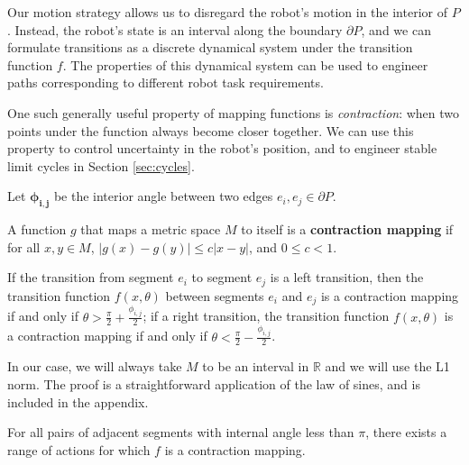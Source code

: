 \documentclass[]{styles/svproc}  %
\begin{document}

Our motion strategy allows us to disregard the robot's motion in the interior of
$P$. Instead, the robot's state is an interval 
along the boundary $\partial P$, and we can formulate transitions as a discrete
dynamical system under the transition function $f$. The properties of this
dynamical system can be used to engineer paths corresponding to different robot
task requirements.

One such generally useful property of mapping functions is \emph{contraction}: 
when two points under the function always become closer together. We can use this property to control
uncertainty in the robot's position, and to engineer stable limit cycles in
Section \ref{sec:cycles}.

\begin{definition}
Let $\bm{\phi_{i,j}}$ be the interior angle between two edges $e_i, e_j \in \partial P$. 
\end{definition}

\begin{definition}

A function $g$ that maps a metric space $M$ to itself is a \textbf{contraction
mapping} if for all
$x, y \in M$, $\lvert g(x) - g(y) \rvert \leq c \lvert x-y \rvert$, and $0 \leq c < 1$.
\end{definition}

\begin{lemma} \label{lemma:angrange}
If the transition from segment $e_i$ to segment $e_j$ is a left transition, then the
transition function $f(x, \theta)$ between segments $e_i$ and $e_j$ is a contraction
mapping if and only if $\theta > \frac{\pi}{2}+\frac{\phi_{i, j}}{2}$;
if a right transition, the transition function $f(x, \theta)$ is a contraction mapping if
and only if $\theta < \frac{\pi}{2}-\frac{\phi_{i, j}}{2}$.
\end{lemma}

In our case, we will always take $M$ to be an interval in $\mathbb{R}$ and we
will use the L1 norm. The proof is a straightforward application of the law of sines, and is included
in the appendix.

\begin{corollary} \label{coro:existcontract}
For all pairs of adjacent 
segments with internal angle less than $\pi$,
there exists a range of actions for which $f$ is a contraction mapping.
\end{corollary}
\end{document}
